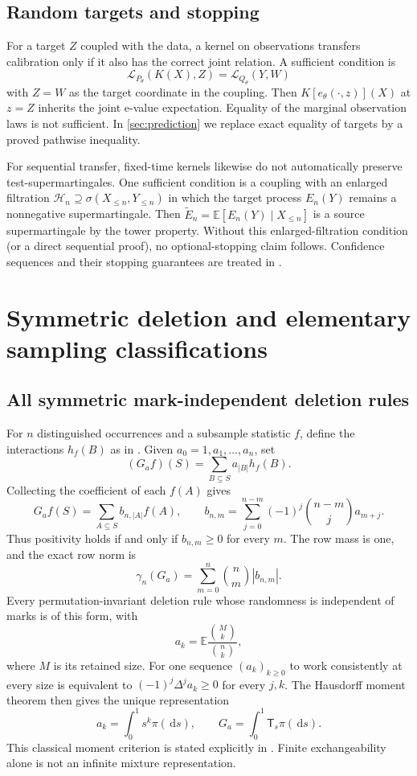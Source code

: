 \documentclass[11pt]{article}
\numberwithin{equation}{section}
\theoremstyle{definition}
\theoremstyle{remark}
\newcommand{\E}{\mathbb E}\newcommand{\Pp}{\mathbb P}\newcommand{\R}{\mathbb R}\newcommand{\N}{\mathbb N}
\newcommand{\dd}{\,\mathrm d}\newcommand{\norm}[1]{\left\lVert#1\right\rVert}\newcommand{\Scal}{\mathsf S}\newcommand{\Tcal}{\mathsf T}
\begin{document}
\subsection{Random targets and stopping}\label{subsec:jointwarning}
For a target $Z$ coupled with the data, a kernel on observations transfers calibration only if it also has the correct joint relation. A sufficient condition is
\[
 \mathcal L_{P_\theta}(K(X),Z)=\mathcal L_{Q_\theta}(Y,W)
\]
with $Z=W$ as the target coordinate in the coupling. Then $K[e_\theta(\cdot,z)](X)$ at $z=Z$ inherits the joint e-value expectation. Equality of the marginal observation laws is not sufficient. In \cref{sec:prediction} we replace exact equality of targets by a proved pathwise inequality.

For sequential transfer, fixed-time kernels likewise do not automatically preserve test-supermartingales. One sufficient condition is a coupling with an enlarged filtration $\mathcal H_n\supseteq\sigma(X_{\le n},Y_{\le n})$ in which the target process $E_n(Y)$ remains a nonnegative supermartingale. Then $\widetilde E_n=\E[E_n(Y)\mid X_{\le n}]$ is a source supermartingale by the tower property. Without this enlarged-filtration condition (or a direct sequential proof), no optional-stopping claim follows. Confidence sequences and their stopping guarantees are treated in \cite{Howard2021}.

\section{Symmetric deletion and elementary sampling classifications}\label{sec:classification}
\subsection{All symmetric mark-independent deletion rules}
For $n$ distinguished occurrences and a subsample statistic $f$, define the interactions $h_f(B)$ as in \cite[Theorem 3.1]{LongI}. Given $a_0=1,a_1,\ldots,a_n$, set
\[
 (G_af)(S)=\sum_{B\subseteq S}a_{|B|}h_f(B).
\]
Collecting the coefficient of each $f(A)$ gives
\begin{equation}\label{eq:mobiusweights}
 G_af(S)=\sum_{A\subseteq S}b_{n,|A|}f(A),\qquad
 b_{n,m}=\sum_{j=0}^{n-m}(-1)^j\binom{n-m}{j}a_{m+j}.
\end{equation}
Thus positivity holds if and only if $b_{n,m}\ge0$ for every $m$. The row mass is one, and the exact row norm is
\begin{equation}\label{eq:deletegamma}
 \gamma_n(G_a)=\sum_{m=0}^n\binom nm|b_{n,m}|.
\end{equation}
Every permutation-invariant deletion rule whose randomness is independent of marks is of this form, with
\[
 a_k=\E\frac{\binom Mk}{\binom nk},
\]
where $M$ is its retained size. For one sequence $(a_k)_{k\ge0}$ to work consistently at every size is equivalent to $(-1)^j\Delta^ja_k\ge0$ for every $j,k$. The Hausdorff moment theorem then gives the unique representation
\[
 a_k=\int_0^1s^k\pi(\dd s),\qquad G_a=\int_0^1\Tcal_s\pi(\dd s).
\]
This classical moment criterion is stated explicitly in \cite[Section 1]{LiuPego2016}. Finite exchangeability alone is not an infinite mixture representation.
\end{document}
